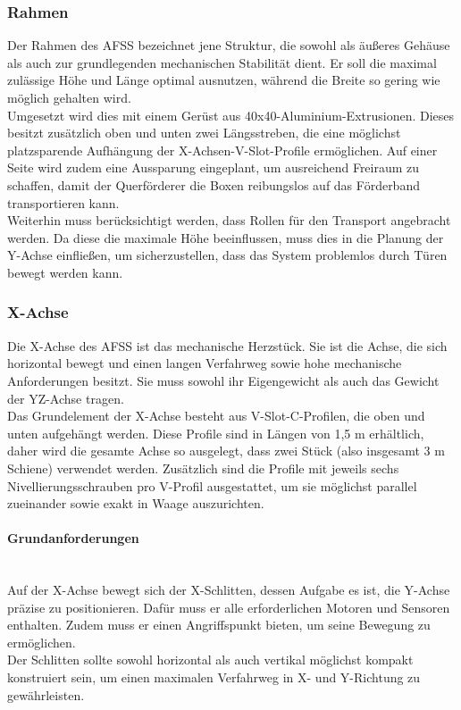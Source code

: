 \subsubsection{Rahmen}

Der Rahmen des AFSS bezeichnet jene Struktur, die sowohl als äußeres Gehäuse als auch zur grundlegenden mechanischen Stabilität dient. Er soll die maximal zulässige Höhe und Länge optimal ausnutzen, während die Breite so gering wie möglich gehalten wird.
\\
Umgesetzt wird dies mit einem Gerüst aus 40x40-Aluminium-Extrusionen. Dieses besitzt zusätzlich oben und unten zwei Längsstreben, die eine möglichst platzsparende Aufhängung der X-Achsen-V-Slot-Profile ermöglichen. Auf einer Seite wird zudem eine Aussparung eingeplant, um ausreichend Freiraum zu schaffen, damit der Querförderer die Boxen reibungslos auf das Förderband transportieren kann.
\\
Weiterhin muss berücksichtigt werden, dass Rollen für den Transport angebracht werden. Da diese die maximale Höhe beeinflussen, muss dies in die Planung der Y-Achse einfließen, um sicherzustellen, dass das System problemlos durch Türen bewegt werden kann.

\subsubsection{X-Achse}
Die X-Achse des AFSS ist das mechanische Herzstück. Sie ist die Achse, die sich horizontal bewegt und einen langen Verfahrweg sowie hohe mechanische Anforderungen besitzt. Sie muss sowohl ihr Eigengewicht als auch das Gewicht der YZ-Achse tragen.
\\
Das Grundelement der X-Achse besteht aus V-Slot-C-Profilen, die oben und unten aufgehängt werden. Diese Profile sind in Längen von 1,5 m erhältlich, daher wird die gesamte Achse so ausgelegt, dass zwei Stück (also insgesamt 3 m Schiene) verwendet werden. Zusätzlich sind die Profile mit jeweils sechs Nivellierungsschrauben pro V-Profil ausgestattet, um sie möglichst parallel zueinander sowie exakt in Waage auszurichten.

\paragraph{Grundanforderungen}\mbox{}\\
Auf der X-Achse bewegt sich der X-Schlitten, dessen Aufgabe es ist, die Y-Achse präzise zu positionieren. Dafür muss er alle erforderlichen Motoren und Sensoren enthalten. Zudem muss er einen Angriffspunkt bieten, um seine Bewegung zu ermöglichen.
\\
Der Schlitten sollte sowohl horizontal als auch vertikal möglichst kompakt konstruiert sein, um einen maximalen Verfahrweg in X- und Y-Richtung zu gewährleisten.

